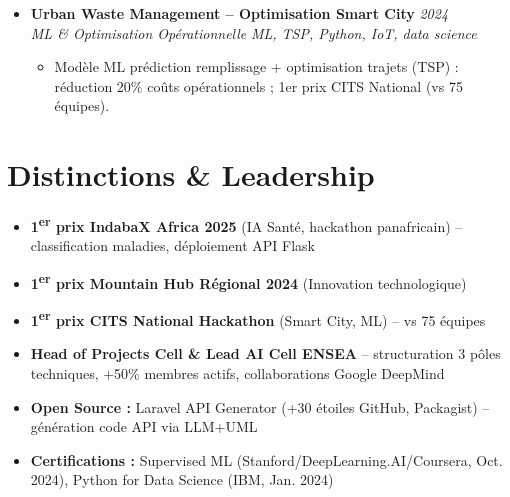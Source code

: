 \documentclass[a4paper,11pt]{article}
\begin{document}
\begin{itemize}[leftmargin=*, label={-}]
    \item \textbf{Urban Waste Management -- Optimisation Smart City} \hfill \textit{2024} \\
    \textit{ML \& Optimisation Opérationnelle} \hfill \textit{ML, TSP, Python, IoT, data science}
    \vspace{-2pt}
    \begin{itemize}[leftmargin=0.4cm, nosep, label=\tiny$\bullet$]
        \item \small{Modèle ML prédiction remplissage + optimisation trajets (TSP) : réduction 20\% coûts opérationnels ; 1er prix CITS National (vs 75 équipes).}
    \end{itemize}
    \vspace{3pt}

\end{itemize}

\section{Distinctions \& Leadership}
\begin{itemize}[leftmargin=*, label=\tiny$\bullet$, nosep]
    \item \small{\textbf{1\textsuperscript{er} prix IndabaX Africa 2025} (IA Santé, hackathon panafricain) -- classification maladies, déploiement API Flask}
    \item \small{\textbf{1\textsuperscript{er} prix Mountain Hub Régional 2024} (Innovation technologique)}
    \item \small{\textbf{1\textsuperscript{er} prix CITS National Hackathon} (Smart City, ML) -- vs 75 équipes}
    \item \small{\textbf{Head of Projects Cell \& Lead AI Cell ENSEA} -- structuration 3 pôles techniques, +50\% membres actifs, collaborations Google DeepMind}
    \item \small{\textbf{Open Source :} Laravel API Generator (+30 étoiles GitHub, Packagist) -- génération code API via LLM+UML}
    \item \small{\textbf{Certifications :} Supervised ML (Stanford/DeepLearning.AI/Coursera, Oct. 2024), Python for Data Science (IBM, Jan. 2024)}
\end{itemize}
\end{document}
